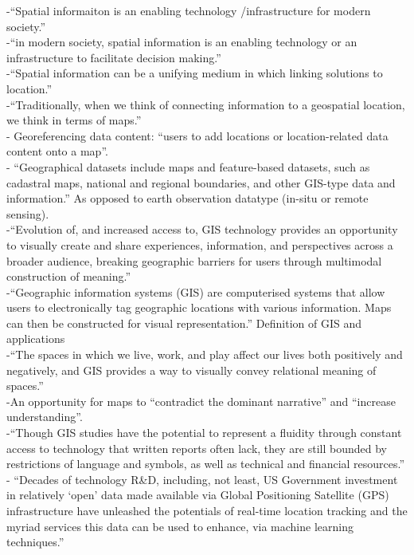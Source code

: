 -{\color{orange}“Spatial informaiton is an enabling technology /infrastructure for modern society.”}\cite{Rajabifard2009}\\
-{\color{orange}“in modern society, spatial information is an enabling technology or an infrastructure to facilitate decision making.”}\cite{Rajabifard2009}\\
-{\color{orange}“Spatial information can be a unifying medium in which linking solutions to location.”}\cite{Rajabifard2009}\\
-{\color{orange}“Traditionally, when we think of connecting information to a geospatial location, we think in terms of maps.”}\cite{Xing2015}\\
-{\color{orange} Georeferencing data content: “users to add locations or location-related data content onto a map”.}\cite{Xing2015}\\
-{\color{orange} “Geographical datasets include maps and feature-based datasets, such as cadastral maps, national and regional boundaries, and other GIS-type data and information.” As opposed to earth observation datatype (in-situ or remote sensing). \cite{Jiang2020}}\\
-{\color{orange}“Evolution of, and increased access to, GIS technology provides an opportunity to visually create and share experiences, information, and perspectives across a broader audience, breaking geographic barriers for users through multimodal construction of meaning.”\cite{McQueenBaker2019}}\\
-{\color{orange}“Geographic information systems (GIS) are computerised systems that allow users to electronically tag geographic locations with various information. Maps can then be constructed for visual representation.” Definition of GIS and applications\cite{McQueenBaker2019}}\\
-{\color{orange}“The spaces in which we live, work, and play affect our lives both positively and negatively, and GIS provides a way to visually convey relational meaning of spaces.'' \cite{McQueenBaker2019}}\\
-{\color{orange}An opportunity for maps to “contradict the dominant narrative” and “increase understanding”.\cite{McQueenBake2019}}\\
-{\color{orange}“Though GIS studies have the potential to represent a fluidity through constant access to technology that written reports often lack, they are still bounded by restrictions of language and symbols, as well as technical and financial resources.”\cite{McQueenBaker2019}}\\
-{\color{orange} “Decades of technology R\&D, including, not least, US Government investment in relatively ‘open’ data made available via Global Positioning Satellite (GPS) infrastructure have unleashed the potentials of real-time location tracking and the myriad services this data can be used to enhance, via machine learning techniques.”\cite{Barns2020}}\\

